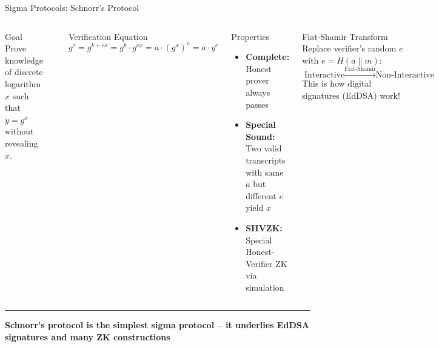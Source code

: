 \documentclass[8pt,aspectratio=169]{beamer}
\newcommand{\bottomnote}[1]{\vfill\vspace{-2mm}\textcolor{mllavender2}{\rule{\textwidth}{0.4pt}}\vspace{1mm}\footnotesize\textbf{#1}}
\begin{document}
\begin{frame}{Sigma Protocols: Schnorr's Protocol}
\begin{columns}[T]
\begin{block}{Goal}
\footnotesize
Prove knowledge of discrete logarithm $x$ such that $y = g^x$ without revealing $x$.
\end{block}
\vspace{1mm}
\begin{center}
\end{center}

\begin{block}{Verification Equation}
\footnotesize
\[
g^z = g^{k + ex} = g^k \cdot g^{ex} = a \cdot (g^x)^e = a \cdot y^e
\]
\end{block}
\vspace{1mm}
\begin{block}{Properties}
\footnotesize
\begin{itemize}
  \item \textbf{Complete:} Honest prover always passes
  \item \textbf{Special Sound:} Two valid transcripts with same $a$ but different $e$ yield $x$
  \item \textbf{SHVZK:} Special Honest-Verifier ZK via simulation
\end{itemize}
\end{block}
\vspace{1mm}
\begin{exampleblock}{\footnotesize Fiat-Shamir Transform}
\footnotesize
Replace verifier's random $e$ with $e = H(a \| m)$:
\[
\text{Interactive} \xrightarrow{\text{Fiat-Shamir}} \text{Non-Interactive}
\]
This is how digital signatures (EdDSA) work!
\end{exampleblock}
\end{columns}
\bottomnote{Schnorr's protocol is the simplest sigma protocol -- it underlies EdDSA signatures and many ZK constructions}
\end{frame}
\end{document}
